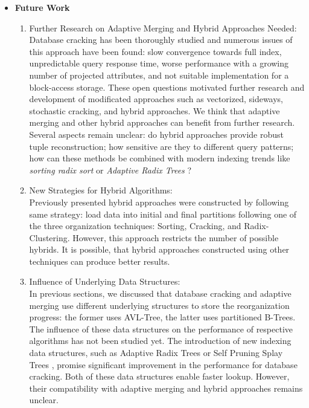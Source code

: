 \documentclass[10pt, conference, compsocconf]{IEEEtran}
\begin{document}
\begin{itemize}
\begin{enumerate}
\end{enumerate}
\item{\textbf{Future Work}}
\begin{enumerate}
\item{Further Research on Adaptive Merging and Hybrid Approaches Needed:}\\
Database cracking has been thoroughly studied and numerous issues of this approach have been found: slow convergence towards full index, unpredictable query response time, worse performance with a growing number of projected attributes, and not suitable implementation for a block-access storage. These open questions motivated further research and development of modificated approaches such as vectorized, sideways, stochastic cracking, and hybrid approaches. We think that adaptive merging and other hybrid approaches can benefit from further research. Several aspects remain unclear: do hybrid approaches provide robust tuple reconstruction; how sensitive are they to different query patterns; how can these methods be combined with modern indexing trends like \emph{sorting radix sort} or \emph{Adaptive Radix Trees} \cite{art}? \\
\item{New Strategies for Hybrid Algorithms:}\\
Previously presented hybrid approaches were constructed by following same strategy: load data into initial and final partitions following one of the three organization techniques: Sorting, Cracking, and Radix-Clustering. However, this approach restricts the number of possible hybrids. It is possible, that hybrid approaches constructed using other techniques can produce better results.\\
\item{Influence of Underlying Data Structures:}\\
In previous sections, we discussed that database cracking and adaptive merging use different underlying structures to store the reorganization progress: the former uses AVL-Tree, the latter uses partitioned B-Trees. The influence of these data structures on the performance of respective algorithms has not been studied yet. The introduction of new indexing data structures, such as Adaptive Radix Trees or Self Pruning Splay Trees \cite{spst}, promise significant improvement in the performance for database cracking. Both of these data structures enable faster lookup. However, their compatibility with adaptive merging and hybrid approaches remains unclear.\\

\end{enumerate}
\end{itemize}
\end{document}
